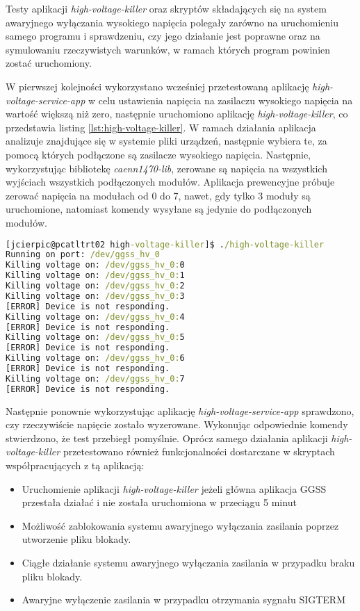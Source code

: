 \clearpage
Testy aplikacji \emph{high-voltage-killer} oraz skryptów składających się na system awaryjnego wyłączania wysokiego napięcia polegały zarówno na uruchomieniu samego programu i sprawdzeniu, czy jego działanie jest poprawne oraz na symulowaniu rzeczywistych warunków, w ramach których program powinien zostać uruchomiony. 

W pierwszej kolejności wykorzystano wcześniej przetestowaną aplikację \emph{high-voltage-service-app} w celu ustawienia napięcia na zasilaczu wysokiego napięcia na wartość większą niż zero, następnie uruchomiono aplikację \emph{high-voltage-killer}, co przedstawia listing \ref{lst:high-voltage-killer}. W ramach działania aplikacja analizuje znajdujące się w systemie pliki urządzeń, następnie wybiera te, za pomocą których podłączone są zasilacze wysokiego napięcia. Następnie, wykorzystując bibliotekę \emph{caenn1470-lib}, zerowane są napięcia na wszystkich wyjściach wszystkich podłączonych modułów. Aplikacja prewencyjne próbuje zerować napięcia na modułach od 0 do 7, nawet, gdy tylko 3 moduły są uruchomione, natomiast komendy wysyłane są jedynie do podłączonych modułów.

\begin{lstlisting}[language=cmd,caption={
    Uruchomienie aplikacji \emph{high-voltage-killer}},
    label={lst:high-voltage-killer},
    frame=single
]
[jcierpic@pcatltrt02 high-voltage-killer]$ ./high-voltage-killer
Running on port: /dev/ggss_hv_0
Killing voltage on: /dev/ggss_hv_0:0
Killing voltage on: /dev/ggss_hv_0:1
Killing voltage on: /dev/ggss_hv_0:2
Killing voltage on: /dev/ggss_hv_0:3
[ERROR] Device is not responding.
Killing voltage on: /dev/ggss_hv_0:4
[ERROR] Device is not responding.
Killing voltage on: /dev/ggss_hv_0:5
[ERROR] Device is not responding.
Killing voltage on: /dev/ggss_hv_0:6
[ERROR] Device is not responding.
Killing voltage on: /dev/ggss_hv_0:7
[ERROR] Device is not responding.
\end{lstlisting}

Następnie ponownie wykorzystując aplikację \emph{high-voltage-service-app} sprawdzono, czy rzeczywiście napięcie zostało wyzerowane. Wykonując odpowiednie komendy stwierdzono, że test przebiegł pomyślnie. Oprócz samego działania aplikacji \emph{high-voltage-killer} przetestowano również funkcjonalności dostarczane w skryptach współpracujących z tą aplikacją:
\begin{itemize}
    \item Uruchomienie aplikacji \emph{high-voltage-killer} jeżeli główna aplikacja GGSS przestała działać i nie została uruchomiona w przeciągu 5 minut
    \item Możliwość zablokowania systemu awaryjnego wyłączania zasilania poprzez utworzenie pliku blokady.
    \item Ciągłe działanie systemu awaryjnego wyłączania zasilania w przypadku braku pliku blokady.
    \item Awaryjne wyłączenie zasilania w przypadku otrzymania sygnału SIGTERM
\end{itemize}

